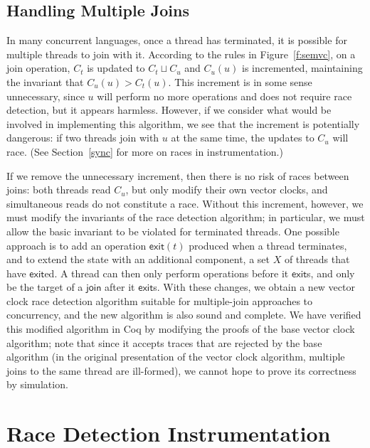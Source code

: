\documentclass[preprint, 10pt]{sigplanconf}
\begin{document}
\subsection{Handling Multiple Joins}
\label{waits}
In many concurrent languages, once a thread has terminated, it is possible for multiple threads to join with it. According to the rules in Figure~\ref{f:semvc}, on a join operation, $C_t$ is updated to $C_t \sqcup C_u$ and $C_u(u)$ is incremented, maintaining the invariant that $C_u(u) > C_t(u)$. This increment is in some sense unnecessary, since $u$ will perform no more operations and does not require race detection, but it appears harmless. However, if we consider what would be involved in implementing this algorithm, we see that the increment is potentially dangerous: if two threads join with $u$ at the same time, the updates to $C_u$ will race. (See Section~\ref{sync} for more on races in instrumentation.)

If we remove the unnecessary increment, then there is no risk of races between joins: both threads read $C_u$, but only modify their own vector clocks, and simultaneous reads do not constitute a race. Without this increment, however, we must modify the invariants of the race detection algorithm; in particular, we must allow the basic invariant to be violated for terminated threads. One possible approach is to add an operation $\mathsf{exit}(t)$ produced when a thread terminates, and to extend the state with an additional component, a set $X$ of threads that have $\mathsf{exit}$ed. A thread can then only perform operations before it $\mathsf{exit}$s, and only be the target of a $\mathsf{join}$ after it $\mathsf{exit}$s. With these changes, we obtain a new vector clock race detection algorithm suitable for multiple-join approaches to concurrency, and the new algorithm is also sound and complete. We have verified this modified algorithm in Coq by modifying the proofs of the base vector clock algorithm; note that since it accepts traces that are rejected by the base algorithm (in the original presentation of the vector clock algorithm, multiple joins to the same thread are ill-formed), we cannot hope to prove its correctness by simulation.

\section{Race Detection Instrumentation}
\label{language}
\end{document}

